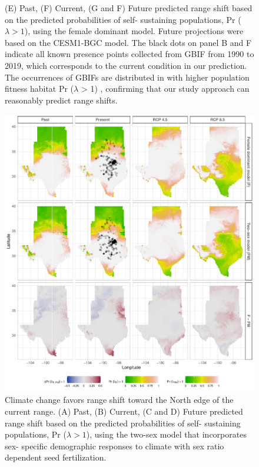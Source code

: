 \documentclass[12pt]{article}\usepackage[]{graphicx}\usepackage[dvipsnames]{xcolor}
\begin{document}
\begin{figure}[H]
\begin{center}
{			(E) Past, (F) Current, (G and F) Future  predicted range shift based on the predicted probabilities of self- sustaining populations, Pr ($\lambda > 1$), using the female dominant model.
			Future projections were based on the CESM1-BGC model.
			The black dots on panel B and F indicate all known presence points collected from GBIF from 1990 to 2019, which corresponds to the current condition in our prediction. 
			The occurrences of GBIFs are distributed in with higher population fitness habitat Pr ($\lambda$ > 1) , confirming that our study approach can reasonably predict range shifts. }
		\label{Sup:geoprojces}
	\end{center}
\end{figure}

\begin{figure}[H]
	\begin{center}
		\includegraphics[width=0.95\linewidth]{Figures/Fig_geoPrlambdaacc.pdf}
		\caption{Climate change favors range shift toward the North edge of the current range.
			(A) Past, (B) Current, (C and D) Future predicted range shift based on the predicted probabilities of self- sustaining populations, Pr ($\lambda > 1$), using the two-sex model that incorporates sex- specific demographic responses to climate with sex ratio dependent seed fertilization.
}
\end{center}
\end{figure}
\end{document}
